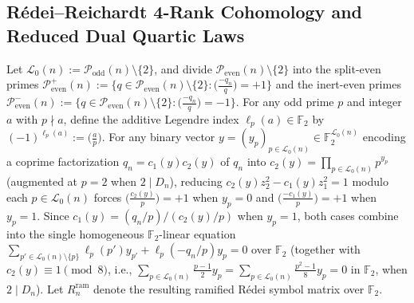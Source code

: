 \documentclass[11pt,reqno]{amsart}
\theoremstyle{remark}
\numberwithin{equation}{section}
\newcommand{\F}{\mathbb{F}}
\newcommand{\Podd}{\mathcal{P}_{\mathrm{odd}}}
\newcommand{\Peven}{\mathcal{P}_{\mathrm{even}}}
\begin{document}
\subsection{R\'edei--Reichardt 4-Rank Cohomology and Reduced Dual Quartic Laws}
Let $\mathcal{L}_0(n) := \Podd(n) \setminus \{2\}$, and divide $\Peven(n) \setminus \{2\}$ into the split-even primes $\Peven^+(n) := \{q \in \Peven(n) \setminus \{2\} : \bigl(\frac{-q_n}{q}\bigr) = +1\}$ and the inert-even primes $\Peven^-(n) := \{q \in \Peven(n) \setminus \{2\} : \bigl(\frac{-q_n}{q}\bigr) = -1\}$. For any odd prime $p$ and integer $a$ with $p \nmid a$, define the additive Legendre index $\ell_p(a) \in \F_2$ by $(-1)^{\ell_p(a)} := \bigl(\frac{a}{p}\bigr)$. For any binary vector $y = (y_p)_{p \in \mathcal{L}_0(n)} \in \F_2^{\mathcal{L}_0(n)}$ encoding a coprime factorization $q_n = c_1(y)c_2(y)$ of $q_n$ into $c_2(y) = \prod_{p \in \mathcal{L}_0(n)} p^{y_p}$ (augmented at $p = 2$ when $2 \mid D_n$), reducing $c_2(y)z_2^2 - c_1(y)z_1^2 = 1$ modulo each $p \in \mathcal{L}_0(n)$ forces $\bigl(\frac{c_2(y)}{p}\bigr) = +1$ when $y_p = 0$ and $\bigl(\frac{-c_1(y)}{p}\bigr) = +1$ when $y_p = 1$. Since $c_1(y) = (q_n/p)/(c_2(y)/p)$ when $y_p = 1$, both cases combine into the single homogeneous $\F_2$-linear equation $\sum_{p' \in \mathcal{L}_0(n) \setminus \{p\}} \ell_p(p')y_{p'} + \ell_p(-q_n/p)y_p = 0$ over $\F_2$ (together with $c_2(y) \equiv 1 \pmod 8$, i.e., $\sum_{p \in \mathcal{L}_0(n)} \frac{p-1}{2}y_p = \sum_{p \in \mathcal{L}_0(n)} \frac{p^2-1}{8}y_p = 0$ in $\F_2$, when $2 \mid D_n$). Let $R_n^{\mathrm{ram}}$ denote the resulting ramified R\'edei symbol matrix over $\F_2$.
\end{document}

